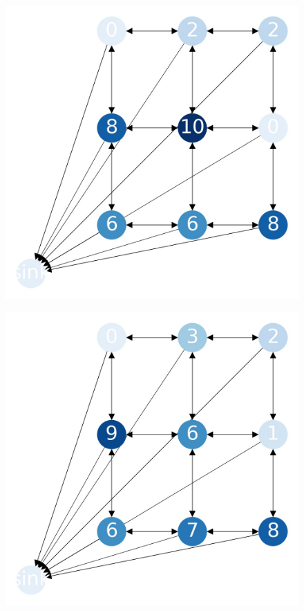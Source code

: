 \documentclass{beamer}
\begin{document}
    \begin{frame}
      \begin{figure}[h!]
        \centering
          \includegraphics[scale=0.25]{sandpile_-8}
      \end{figure}
    \end{frame}
    

    \begin{frame}
      \begin{figure}[h!]
        \centering
          \includegraphics[scale=0.25]{sandpile_-9}
      \end{figure}
    \end{frame}
    
\end{document}
